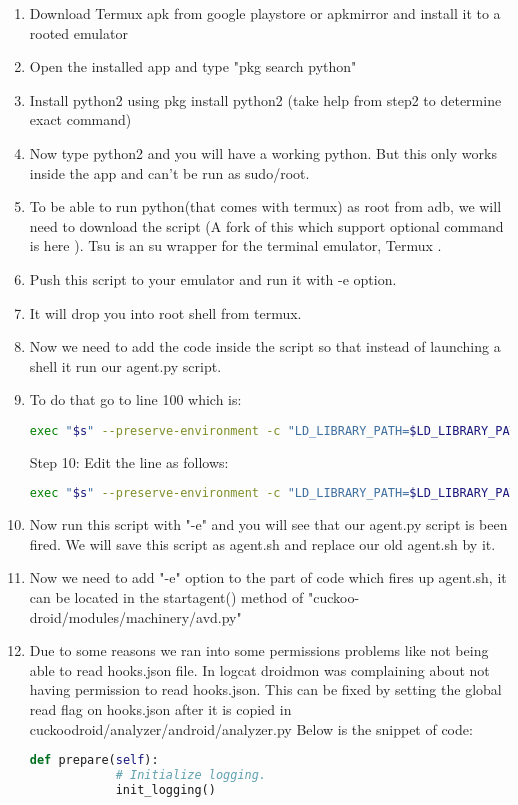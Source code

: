 \documentclass[../main.tex]{subfile}
\begin{document}
		\begin{enumerate}
		\item Download Termux apk from google playstore or apkmirror and install it to a rooted emulator
		\item Open the installed app and type "pkg search python"
		\item Install python2 using pkg install python2 (take help from step2 to determine exact command)
		\item Now type python2 and you will have a working python. But this only works inside the app and can't be run as sudo/root.
		\item To be able to run python(that comes with termux) as root from adb, we will need to download the script \cite{tsu_cswl}  (A fork of this which support optional command is here \cite{tsu_kiney}). Tsu is an su wrapper for the terminal emulator, Termux \cite{termux_website}.
		\item Push this script to your emulator and run it with -e option.
		\item It will drop you into root shell from termux.
		\item Now we need to add the code inside the script so that instead of launching a shell it run our agent.py script.
		\item To do that go to line 100 which is:
		\begin{lstlisting}[language=bash]
		exec "$s" --preserve-environment -c "LD_LIBRARY_PATH=$LD_LIBRARY_PATH $ROOT_SHELL" 
		\end{lstlisting}
		Step 10: Edit the line as follows:
		\begin{lstlisting}[language=bash]
		exec "$s" --preserve-environment -c "LD_LIBRARY_PATH=$LD_LIBRARY_PATH python2 /data/local/agent.py" 
		\end{lstlisting}
		
		\item Now run this script with "-e" and you will see that our agent.py script is been fired. We will save this script as agent.sh and replace our old agent.sh by it.
		\item Now we need to add "-e" option to the part of code which fires up agent.sh, it can be located in the start\textunderscore agent() method of "cuckoo-droid/modules/machinery/avd.py"
		\item Due to some reasons we ran into some permissions problems like not being able to read hooks.json file. In logcat droidmon was complaining about not having permission to read hooks.json. This can be fixed by setting the global read flag on hooks.json after it is copied in cuckoodroid/analyzer/android/analyzer.py Below is the snippet of code:
		\begin{lstlisting}[language=python]
		def prepare(self):
			# Initialize logging.
			init_logging()
			

\end{lstlisting}
\end{enumerate}
\end{document}
